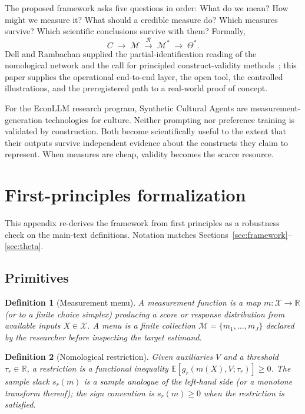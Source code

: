 \documentclass[10pt,letterpaper]{article}
\newtheorem{definition}{Definition}[section]
\newcommand{\M}{\ensuremath{\mathcal{M}}}
\newcommand{\E}{\mathbb{E}}
\newcommand{\Rset}{\mathcal{R}}
\begin{document}
The proposed framework asks five questions in order:
What do we mean?
How might we measure it?
What should a credible measure do?
Which measures survive?
Which scientific conclusions survive with them?
Formally,
\[
C\;\longrightarrow\;\M\;\xrightarrow{\Rset}\;\M^*\;\longrightarrow\;\Theta^*.
\]
Dell and Rambachan supplied the partial-identification reading of the nomological network and the call for principled construct-validity methods~\cite{dellrambachan2026}; this paper supplies the operational end-to-end layer, the open tool, the controlled illustrations, and the preregistered path to a real-world proof of concept.

For the EconLLM research program, Synthetic Cultural Agents are measurement-generation technologies for culture.
Neither prompting nor preference training is validated by construction.
Both become scientifically useful to the extent that their outputs survive independent evidence about the constructs they claim to represent.
When measures are cheap, validity becomes the scarce resource.

\clearpage
\appendix
\section{First-principles formalization}
\label{app:first}
This appendix re-derives the framework from first principles as a robustness check on the main-text definitions.
Notation matches Sections~\ref{sec:framework}--\ref{sec:theta}.

\subsection{Primitives}
\begin{definition}[Measurement menu]
A \emph{measurement function} is a map $m:\mathcal{X}\to\mathbb{R}$ (or to a finite choice simplex) producing a score or response distribution from available inputs $X\in\mathcal{X}$.
A \emph{menu} is a finite collection $\M=\{m_1,\ldots,m_J\}$ declared by the researcher before inspecting the target estimand.
\end{definition}

\begin{definition}[Nomological restriction]
Given auxiliaries $V$ and a threshold $\tau_r\in\mathbb{R}$, a \emph{restriction} is a functional inequality
$\E[g_r(m(X),V;\tau_r)]\ge 0$.
The \emph{sample slack} $s_r(m)$ is a sample analogue of the left-hand side (or a monotone transform thereof); the sign convention is $s_r(m)\ge 0$ when the restriction is satisfied.
\end{definition}
\end{document}

